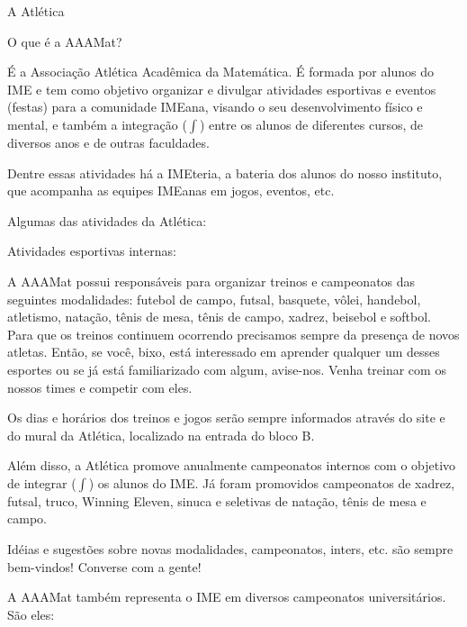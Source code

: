 \begin{secao}{A Atlética}

\begin{subsecao}{O que é a AAAMat?}

É a Associação Atlética Acadêmica da Matemática. É formada por alunos do IME e
tem como objetivo organizar e divulgar atividades esportivas e eventos (festas)
para a comunidade IMEana, visando o seu desenvolvimento físico e mental,
e também a integração ($\int$) entre os alunos de diferentes cursos, de diversos
anos e de outras faculdades.

Dentre essas atividades há a IMEteria, a bateria dos alunos do nosso instituto,
que acompanha as equipes IMEanas em jogos, eventos, etc.

\end{subsecao}

Algumas das atividades da Atlética:

\begin{subsecao}{Atividades esportivas internas:}

A AAAMat possui responsáveis para organizar treinos e campeonatos das seguintes 
modalidades: futebol de campo, futsal, basquete, vôlei, handebol, atletismo, 
natação, tênis de mesa, tênis de campo, xadrez, beisebol e softbol. Para 
que os treinos continuem ocorrendo precisamos sempre da presença de novos 
atletas. Então, se você, bixo, está interessado em aprender qualquer um desses 
esportes ou se já está familiarizado com algum, avise-nos. Venha treinar com os 
nossos times e competir com eles.

Os dias e horários dos treinos e jogos serão sempre informados através do site
e do mural da Atlética, localizado na entrada do bloco B.

Além disso, a Atlética promove anualmente campeonatos internos com o objetivo de
integrar ($\int$) os alunos do IME. Já foram promovidos campeonatos de xadrez,
futsal, truco, Winning Eleven, sinuca e seletivas de natação, tênis de mesa e 
campo.

Idéias e sugestões sobre novas modalidades, campeonatos, inters, etc. são sempre
 bem-vindos! Converse com a gente!

\end{subsecao}

A AAAMat também representa o IME em diversos campeonatos universitários. São
eles:


\end{secao}
